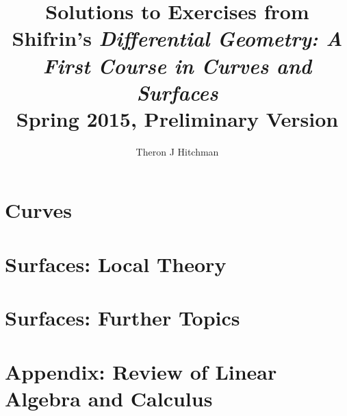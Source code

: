 \documentclass[11pt]{amsbook}
\title{Solutions to Exercises from \\
Shifrin's \emph{Differential Geometry: A First Course in Curves and Surfaces}\\
Spring 2015, Preliminary Version}
\author{Theron J Hitchman}
\theoremstyle{plain}
\begin{document}
\maketitle

\tableofcontents



\chapter{Curves}

\pagebreak


\pagebreak


\pagebreak


\chapter{Surfaces: Local Theory}


\pagebreak


\pagebreak


\pagebreak


\pagebreak

\chapter{Surfaces: Further Topics}


\pagebreak


\pagebreak


\pagebreak


\pagebreak

\chapter{Appendix: Review of Linear Algebra and Calculus}







\end{document}
